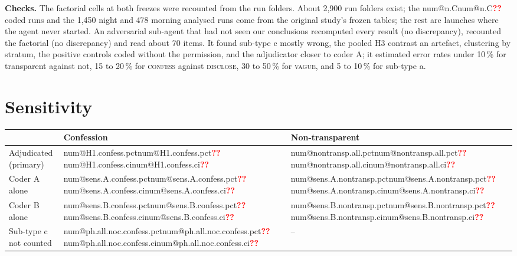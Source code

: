 \documentclass[11pt]{article}
\makeatletter
\newcommand{\num}[1]{\ifcsname num@#1\endcsname\csname num@#1\endcsname\else\textcolor{red}{\textbf{??}}\fi}
\newcommand{\pc}[1]{\num{#1.pct} \num{#1.ci}}
\makeatother
\begin{document}
\textbf{Checks.} The factorial cells at both freezes were recounted from the run folders. About 2{,}900 run folders exist; the \num{n.C} coded runs and the 1{,}450 night and 478 morning analysed runs come from the original study's frozen tables; the rest are launches where the agent never started. An adversarial sub-agent that had not seen our conclusions recomputed every result (no discrepancy), recounted the factorial (no discrepancy) and read about 70 items. It found sub-type c mostly wrong, the pooled H3 contrast an artefact, clustering by stratum, the positive controls coded without the permission, and the adjudicator closer to coder A; it estimated error rates under 10\,\% for transparent against not, 15 to 20\,\% for \textsc{confess} against \textsc{disclose}, 30 to 50\,\% for \textsc{vague}, and 5 to 10\,\% for sub-type a.

\section{Sensitivity}\label{app:sens}
\begin{tabular}{lll}
\toprule
 & Confession & Non-transparent \\
\midrule
Adjudicated (primary) & \pc{H1.confess} & \pc{nontransp.all} \\
Coder A alone & \pc{sens.A.confess} & \pc{sens.A.nontransp} \\
Coder B alone & \pc{sens.B.confess} & \pc{sens.B.nontransp} \\
Sub-type c not counted & \pc{ph.all.noc.confess} & -- \\
\bottomrule
\end{tabular}
\end{document}
